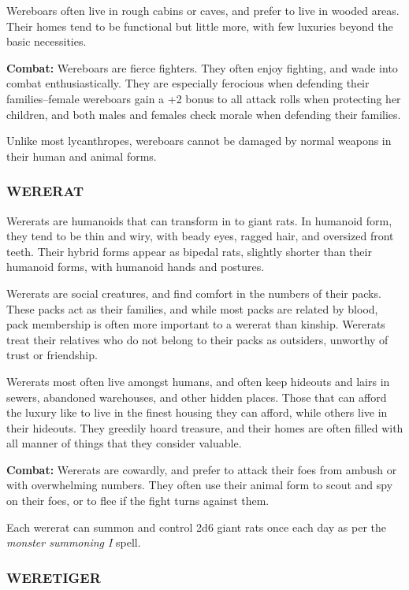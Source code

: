 \begin{multicols}{2}
Wereboars often live in rough cabins or caves, and prefer to live in wooded areas. Their homes tend to be functional but little more, with few luxuries beyond the basic necessities.

\textbf{Combat:} Wereboars are fierce fighters. They often enjoy fighting, and wade into combat enthusiastically. They are especially ferocious when defending their families--female wereboars gain a +2 bonus to all attack rolls when protecting her children, and both males and females check morale when defending their families.

Unlike most lycanthropes, wereboars cannot be damaged by normal weapons in their human and animal forms.

\subsubsection{WERERAT}

Wererats are humanoids that can transform in to giant rats. In humanoid form, they tend to be thin and wiry, with beady eyes, ragged hair, and oversized front teeth. Their hybrid forms appear as bipedal rats, slightly shorter than their humanoid forms, with humanoid hands and postures.

Wererats are social creatures, and find comfort in the numbers of their packs. These packs act as their families, and while most packs are related by blood, pack membership is often more important to a wererat than kinship. Wererats treat their relatives who do not belong to their packs as outsiders, unworthy of trust or friendship.

Wererats most often live amongst humans, and often keep hideouts and lairs in sewers, abandoned warehouses, and other hidden places. Those that can afford the luxury like to live in the finest housing they can afford, while others live in their hideouts. They greedily hoard treasure, and their homes are often filled with all manner of things that they consider valuable.

\textbf{Combat:} Wererats are cowardly, and prefer to attack their foes from ambush or with overwhelming numbers. They often use their animal form to scout and spy on their foes, or to flee if the fight turns against them.

Each wererat can summon and control 2d6 giant rats once each day as per the \textit{monster summoning I} spell.

\subsubsection{WERETIGER}


\end{multicols}
